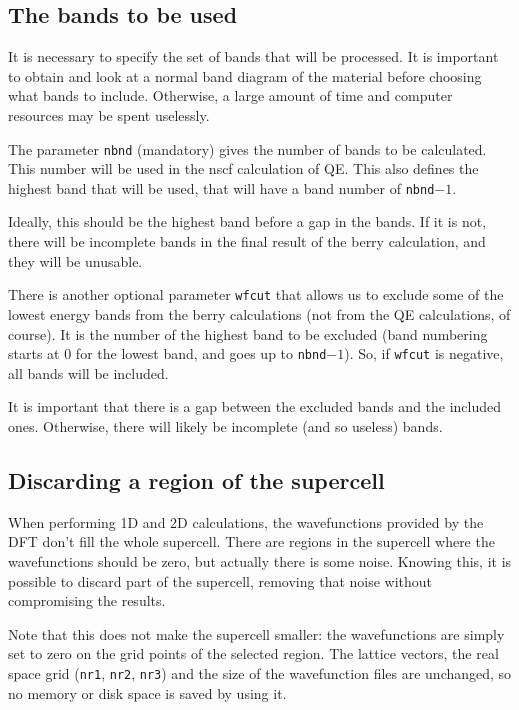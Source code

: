 \documentclass[a4paper,12pt]{report}
\begin{document}
\bigskip

 \subsection{The bands to be used}

 It is necessary to specify the set of bands that will be processed.
 It is important to obtain and look at a normal band diagram of the material before choosing
 what bands to include.
 Otherwise, a large amount of time and computer resources may be spent uselessly.

 The parameter \verb|nbnd| (mandatory) gives the number of bands to be calculated.
 This number will be used in the nscf calculation of QE.
 This also defines the highest band that will be used, that will have a band number of \verb|nbnd|$-1$.

 Ideally, this should be the highest band before a gap in the bands.
 If it is not, there will be incomplete bands in the final result of the berry calculation,
 and they will be unusable.

 There is another optional parameter \verb|wfcut| that allows us to exclude some of the lowest energy bands
 from the berry calculations (not from the QE calculations, of course).
 It is the number of the highest band to be excluded
 (band numbering starts at 0 for the lowest band, and goes up to \verb|nbnd|$-1$).
 So, if \verb|wfcut| is negative, all bands will be included.

 It is important that there is a gap between the excluded bands and the included ones.
 Otherwise, there will likely be incomplete (and so useless) bands.


\bigskip

 \subsection{Discarding a region of the supercell}

 When performing 1D and 2D calculations, the wavefunctions provided by the DFT don't fill the whole
 supercell.
 There are regions in the supercell where the wavefunctions should be zero, but actually
 there is some noise.
 Knowing this, it is possible to discard part of the supercell, removing that noise without
 compromising the results.

 Note that this does not make the supercell smaller: the wavefunctions are simply set to zero
 on the grid points of the selected region.
 The lattice vectors, the real space grid (\verb|nr1|, \verb|nr2|, \verb|nr3|) and the size of
 the wavefunction files are unchanged, so no memory or disk space is saved by using it.
\end{document}
